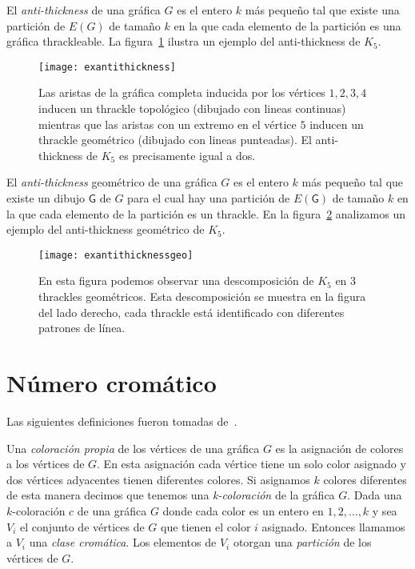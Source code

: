 El \emph{anti-thickness} de una gráfica $G$ es el entero $k$ más pequeño tal que existe una
partición de $E(G)$ de tamaño $k$ en la que cada elemento de la partición
es una gráfica thrackleable. La figura~\ref{fig:exantithickness} ilustra un ejemplo del
anti-thickness de $K_5$.
\begin{figure}[htpb]
  \centering
  \texttt{[image: exantithickness]}
  \caption{Las aristas de la gráfica completa inducida por los vértices $1,2,3,4$
  inducen un thrackle topológico (dibujado con lineas continuas)
  mientras que las aristas con un extremo en el vértice $5$ inducen un thrackle geométrico
  (dibujado con lineas punteadas).
  El anti-thickness de $K_5$ es precisamente igual a dos.}
  \label{fig:exantithickness}
\end{figure}

El \emph{anti-thickness} geométrico de una gráfica $G$ es el entero $k$ más pequeño tal que
existe un dibujo $\mathsf{G}$ de $G$ para el cual hay una partición de $E(\mathsf{G})$
de tamaño $k$ en la que cada elemento de la partición es un thrackle. En la
figura~\ref{fig:exantithicknessgeo} analizamos un ejemplo del anti-thickness geométrico de $K_5$.

\begin{figure}[htpb]
  \centering
  \texttt{[image: exantithicknessgeo]}
  \caption{En esta figura podemos observar una descomposición de $K_5$ en 3 thrackles
  geométricos. Esta descomposición se muestra en la figura del lado derecho, cada
  thrackle está identificado con diferentes patrones de línea.}
  \label{fig:exantithicknessgeo}
\end{figure}
\section{Número cromático}
Las siguientes definiciones fueron tomadas de~\cite{Chartrand2008}.

Una \emph{coloración propia} de los vértices de una gráfica $G$ es la asignación
de colores a los vértices de $G$. En esta asignación cada vértice tiene un solo color
asignado y dos vértices adyacentes tienen diferentes colores. Si asignamos $k$ colores
diferentes de esta manera decimos que tenemos una \emph{k-coloración} de la gráfica $G$.
Dada una $k$-coloración $c$ de una gráfica $G$ donde cada color es un entero en $1,2,\dots,k$
y sea $V_i$ el conjunto de vértices de $G$ que tienen el color $i$ asignado. Entonces
llamamos a $V_i$ una \emph{clase cromática}. Los elementos de $V_i$ otorgan una \emph{partición}
de los vértices de $G$.

